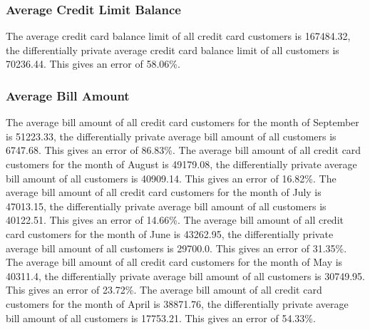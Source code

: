\documentclass{article}%
\begin{document}
%
\subsubsection{Average Credit Limit Balance}%
\label{ssubsec:AverageCreditLimitBalance}%
The average credit card balance limit of all credit card customers is 167484.32, the differentially private average credit card balance limit of all customers is 70236.44. This gives an error of 58.06\%.

%
\subsubsection{Average Bill Amount}%
\label{ssubsec:AverageBillAmount}%
The average bill amount of all credit card customers for the month of September is 51223.33, the differentially private average bill amount of all customers is 6747.68. This gives an error of 86.83\%.%
The average bill amount of all credit card customers for the month of August is 49179.08, the differentially private average bill amount of all customers is 40909.14. This gives an error of 16.82\%.%
The average bill amount of all credit card customers for the month of July is 47013.15, the differentially private average bill amount of all customers is 40122.51. This gives an error of 14.66\%.%
The average bill amount of all credit card customers for the month of June is 43262.95, the differentially private average bill amount of all customers is 29700.0. This gives an error of 31.35\%.%
The average bill amount of all credit card customers for the month of May is 40311.4, the differentially private average bill amount of all customers is 30749.95. This gives an error of 23.72\%.%
The average bill amount of all credit card customers for the month of April is 38871.76, the differentially private average bill amount of all customers is 17753.21. This gives an error of 54.33\%.

%
\end{document}

